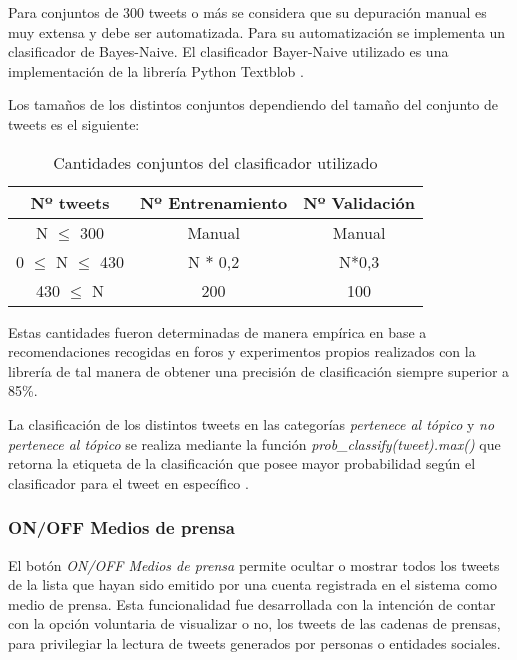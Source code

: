 Para conjuntos de 300 tweets o más se considera que su depuración manual es muy extensa y debe ser automatizada. Para su automatización se implementa un clasificador de Bayes-Naive. El clasificador Bayer-Naive utilizado es una implementación de la librería Python Textblob \cite{textblobWebsite}.

Los tamaños de los distintos conjuntos dependiendo del tamaño del conjunto de tweets es el siguiente:

\begin{table}[h]
	\centering
	\begin{tabular}{| c | c | c |}
		\hline
		Nº tweets & Nº Entrenamiento & Nº Validación \\ \hline
		N $\leqslant$ 300	& Manual & Manual \\ \hline
		0 $\leqslant$ N $\leqslant$ 430	& N $*$ 0,2 & N*0,3	\\ \hline
		430 $\leqslant$ N & 200 & 100	\\ \hline
	\end{tabular}
	\caption {Cantidades conjuntos del clasificador utilizado}
\end{table}

Estas cantidades fueron determinadas de manera empírica en base a recomendaciones recogidas en foros y experimentos propios realizados con la librería de tal manera de obtener una precisión de clasificación siempre superior a 85\%.

	

La clasificación de los distintos tweets en las categorías \emph{pertenece al tópico} y \emph{no pertenece al tópico} se realiza mediante la función \emph{prob\_classify(tweet).max()} que retorna la etiqueta de la clasificación que posee mayor probabilidad según el clasificador para el tweet en específico \cite{naivebayesdoc}.



	



\subsubsection{ON/OFF Medios de prensa}
El botón \emph{ON/OFF Medios de prensa} permite ocultar o mostrar todos los tweets de la lista que hayan sido emitido por una cuenta registrada en el sistema como medio de prensa. Esta funcionalidad fue desarrollada con la intención de contar con la opción voluntaria de visualizar o no, los tweets de las cadenas de prensas, para privilegiar la lectura de tweets generados por personas o entidades sociales.
